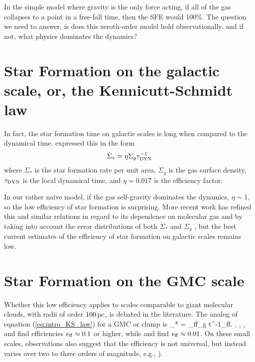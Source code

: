 \documentclass[../dissertation.tex]{subfiles}
\begin{document}
In the simple model where gravity is the only force acting, if all of the gas collapses to a point in a free-fall time, then the SFE would 100\%.
The question we need to answer, is does this zeroth-order model hold observationally, and if not, what physics dominates the dynamics?

\section{Star Formation on the galactic scale, or, the Kennicutt-Schmidt law}
In fact, the star formation time on galactic scales is long when compared to the dynamical time. 
\citet{1998ApJ...498..541K} expressed this in the form
%
\begin{equation}\label{eq:intro_KS_law}
\dot{\Sigma}_* = \eta\Sigma_g \tau_{\rm DYN}^{-1}
\end{equation}
%
where $\dot{\Sigma}_*$ is the star formation rate per unit area, $\Sigma_g$ is the 
gas surface density, $\tau_{\rm DYN}$ is the local dynamical time, and $\eta = 0.017$ 
is the efficiency factor.  

In our rather naive model, if the gas self-gravity dominates the dynamics, $\eta \sim 1$, so the low efficiency of star formation is surprising. 
More recent work has refined this and similar relations in regard to its dependence on molecular gas \citep{2008AJ....136.2846B} and by taking into account the error distributions of both $\dot\Sigma_*$ and $\Sigma_g$ \citep{2013MNRAS.430..288S}, but the best current estimates of the efficiency of star formation on galactic scales remains low. 

\section{Star Formation on the GMC scale}
Whether this low efficiency applies to scales comparable to giant molecular clouds, with radii of
order $100\,\rm pc$, is debated in the literature. The analog of equation (\ref{eq:intro_KS_law}) for a GMC or clump is
%
\be
\dot \Sigma_* = \epsilon_{\rm ff}\Sigma_g t^{-1}_{\rm ff}.
\ee
%
\citet{2010ApJ...723.1019H}, \citet{2010ApJ...724..687L}, \citet{2010ApJS..188..313W}, and \citet{2011ApJ...729..133M} 
find efficiencies $\epsilon_{\rm ff}\approx 0.1$ or higher,  while \citet{2007ApJ...654..304K} and \citet{2012ApJ...745...69K} 
find $\epsilon_{\rm ff}\approx0.01$.
On these small scales, observations also suggest that the efficiency is not universal, but instead 
varies over two to three orders of magnitude, e.g., 
\citealt{1988ApJ...334L..51M,1989ApJ...339..149S,2016ApJ...833..229L}).%
\end{document}
